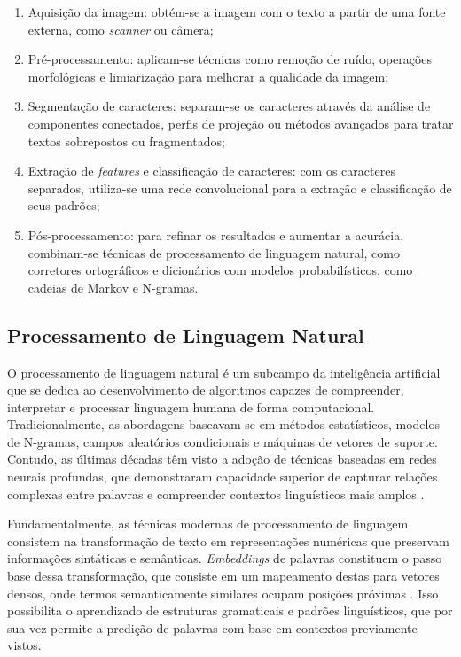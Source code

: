 \begin{enumerate}
	\item Aquisição da imagem: obtém-se a imagem com o texto a partir de uma fonte externa, como \textit{scanner} ou câmera;
	\item Pré-processamento: aplicam-se técnicas como remoção de ruído, operações morfológicas e limiarização para melhorar a qualidade da imagem;
	\item Segmentação de caracteres: separam-se os caracteres através da análise de componentes conectados, perfis de projeção ou métodos avançados para tratar textos sobrepostos ou fragmentados;
	\item Extração de \textit{features} e classificação de caracteres: com os caracteres separados, utiliza-se uma rede convolucional para a extração e classificação de seus padrões;
	\item Pós-processamento: para refinar os resultados e aumentar a acurácia, combinam-se técnicas de processamento de linguagem natural, como corretores ortográficos e dicionários com modelos probabilísticos, como cadeias de Markov e N-gramas.
\end{enumerate}

\subsection{Processamento de Linguagem Natural}

O processamento de linguagem natural é um subcampo da inteligência artificial que se dedica ao desenvolvimento de algoritmos capazes de compreender, interpretar e processar linguagem humana de forma computacional. Tradicionalmente, as abordagens baseavam-se em métodos estatísticos, modelos de N-gramas, campos aleatórios condicionais e máquinas de vetores de suporte. Contudo, as últimas décadas têm visto a adoção de técnicas baseadas em redes neurais profundas, que demonstraram capacidade superior de capturar relações complexas entre palavras e compreender contextos linguísticos mais amplos \cite{nlp}.

Fundamentalmente, as técnicas modernas de processamento de linguagem consistem na transformação de texto em representações numéricas que preservam informações sintáticas e semânticas. \textit{Embeddings} de palavras constituem o passo base dessa transformação, que consiste em um mapeamento destas para vetores densos, onde termos semanticamente similares ocupam posições próximas \cite{nlp}. Isso possibilita o aprendizado de estruturas gramaticais e padrões linguísticos, que por sua vez permite a predição de palavras com base em contextos previamente vistos.

